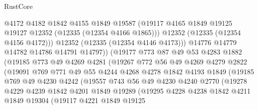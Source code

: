 \begin{lexlean}{RustCore}
\begin{coremodule}
                          @4172
                          @4182
                          @1842
                          @4155
                          @1849
                          @19587
                          (@19117 @4165 @1849 @19125 @19127 @12352 (@12335 (@12354 @4166 @1865)))
                          @12352
                          (@12335 (@12354 @4156 @4172)))
                        @12352
                        (@12335 (@12354 @4146 @4173)))
                      @14776
                      @14779
                      @14782
                      @14786
                      @14791
                      @14797))
                  (@19177
                    @773
                    @87
                    @49
                    @53
                    @4283
                    @1882
                    (@19185
                      @773
                      @49
                      @4269
                      @4281
                      (@19267
                        @772
                        @56
                        @49
                        @4269
                        @4279
                        @2822
                        (@19091
                          @769
                          @771
                          @49
                          @55
                          @4244
                          @4268
                          @4278
                          @1842
                          @4193
                          @1849
                          (@19185
                            @769
                            @49
                            @4230
                            @4242
                            (@19557
                              @743
                              @56
                              @49
                              @4230
                              @4240
                              @2770
                              (@19278
                                @4229
                                @4239
                                @1842
                                @4201
                                @1849
                                @19289
                                (@19295
                                  @4228
                                  @4238
                                  @1842
                                  @4211
                                  @1849
                                  @19304
                                  (@19117
                                    @4221
                                    @1849
                                    @19125

\end{coremodule}
\end{lexlean}
